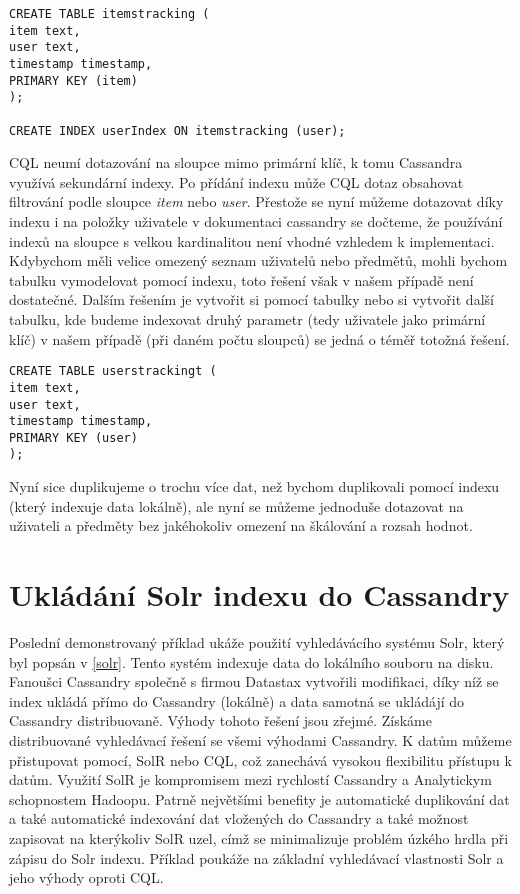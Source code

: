 \documentclass[thesis=M,czech]{FITthesis}[2012/06/26]
\begin{document}
\begin{lstlisting}[caption={Vytvoření tabulky s dvojsměrnou vazbou pomocí indexu},label=CQL10]
CREATE TABLE itemstracking ( 
item text,
user text,
timestamp timestamp,
PRIMARY KEY (item)
);

CREATE INDEX userIndex ON itemstracking (user);
\end{lstlisting}

CQL neumí dotazování na sloupce mimo primární klíč, k tomu Cassandra využívá sekundární indexy. Po přídání indexu může CQL dotaz obsahovat filtrování podle sloupce \emph{item} nebo \emph{user}. Přestože se nyní můžeme dotazovat díky indexu i na položky uživatele v dokumentaci cassandry \cite{cassaindex} se dočteme, že používání indexů na sloupce s velkou kardinalitou není vhodné vzhledem k implementaci. Kdybychom měli velice omezený seznam uživatelů nebo předmětů, mohli bychom tabulku vymodelovat pomocí indexu, toto řešení však v našem případě není dostatečné. Dalším řešením je vytvořit si  pomocí tabulky nebo si vytvořit další tabulku, kde budeme indexovat druhý parametr (tedy uživatele jako primární klíč) v našem případě (při daném počtu sloupců) se jedná o téměř totožná řešení. 

\begin{lstlisting}[caption={Vytvoření indexovací tabulky},label=CQL11]
CREATE TABLE userstrackingt ( 
item text,
user text,
timestamp timestamp,
PRIMARY KEY (user)
);
\end{lstlisting}

Nyní sice duplikujeme o trochu více dat, než bychom duplikovali pomocí indexu (který indexuje data lokálně), ale nyní se můžeme jednoduše dotazovat na uživateli a předměty bez jakéhokoliv omezení na škálování a rozsah hodnot. 

\section{Ukládání Solr indexu do Cassandry}
Poslední demonstrovaný příklad ukáže použití vyhledávácího systému Solr, který byl popsán v  \ref{solr}. Tento systém indexuje data do lokálního souboru na disku. Fanoušci Cassandry společně s firmou Datastax vytvořili modifikaci, díky níž se index ukládá přímo do Cassandry (lokálně) a data samotná se ukládájí do Cassandry distribuovaně. Výhody tohoto řešení jsou zřejmé. Získáme distribuované vyhledávací řešení se všemi výhodami Cassandry. K datům můžeme přistupovat pomocí, SolR nebo CQL, což zanechává vysokou flexibilitu přístupu k datům. Využití SolR je kompromisem mezi rychlostí Cassandry a Analytickym schopnostem Hadoopu. Patrně největšími benefity je automatické duplikování dat a také automatické indexování dat vložených do Cassandry a také možnost zapisovat na kterýkoliv SolR uzel, címž se minimalizuje problém úzkého hrdla při zápisu do Solr indexu. Příklad poukáže na základní vyhledávací vlastnosti Solr a jeho výhody oproti CQL.
\end{document}
